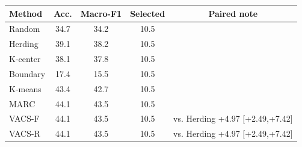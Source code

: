 \begin{tabular}{lcccc}
\toprule
Method & Acc. & Macro-F1 & Selected & Paired note \\
\midrule
Random & 34.7 & 34.2 & 10.5 &  \\
Herding & 39.1 & 38.2 & 10.5 &  \\
K-center & 38.1 & 37.8 & 10.5 &  \\
Boundary & 17.4 & 15.5 & 10.5 &  \\
K-means & 43.4 & 42.7 & 10.5 &  \\
MARC & 44.1 & 43.5 & 10.5 &  \\
VACS-F & 44.1 & 43.5 & 10.5 & vs. Herding +4.97 [+2.49,+7.42] \\
VACS-R & 44.1 & 43.5 & 10.5 & vs. Herding +4.97 [+2.49,+7.42] \\
\bottomrule
\end{tabular}
